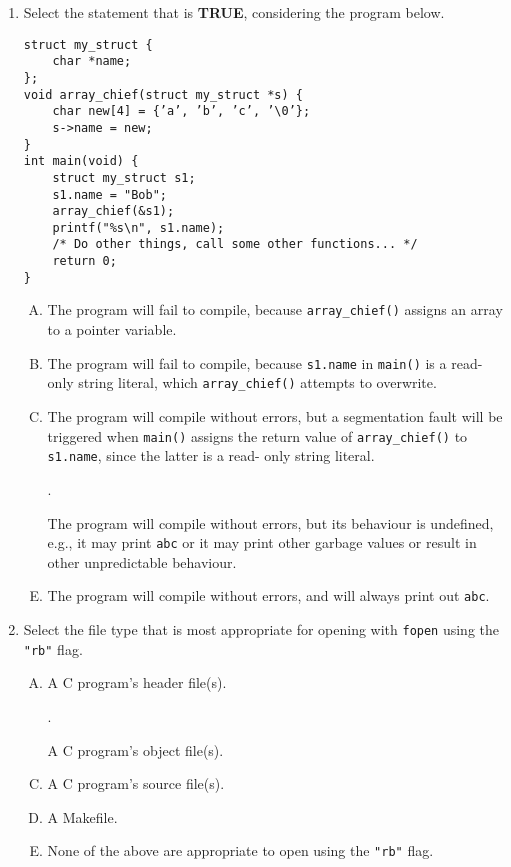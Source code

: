 \documentclass[11pt]{article}
\begin{document}
\begin{enumerate}[{1}.1]
	\newpage
	\item Select the statement that is \textbf{TRUE}, considering the program below.
		\begin{Verbatim}
struct my_struct {
	char *name;
};
void array_chief(struct my_struct *s) {
	char new[4] = {’a’, ’b’, ’c’, ’\0’};
	s->name = new;
}
int main(void) {
	struct my_struct s1;
	s1.name = "Bob";
	array_chief(&s1);
	printf("%s\n", s1.name);
	/* Do other things, call some other functions... */
	return 0;
}
		\end{Verbatim}
		\begin{enumerate}[A.]
			\item The program will fail to compile, because \Verb|array_chief()| assigns an array to a pointer variable.
			\item The program will fail to compile, because \Verb|s1.name| in \Verb|main()| is a read-only string literal, which \Verb|array_chief()| attempts to overwrite.
			\item The program will compile without errors, but a segmentation fault will be triggered when \Verb|main()| assigns the return value of \Verb|array_chief()| to \Verb|s1.name|, since the latter is a read- only string literal.
			\item[\textcolor{correct}{\addtocounter{enumii}{1}\Alph{enumii}.}] \textcolor{correct}{The program will compile without errors, but its behaviour is undefined, e.g., it may print \Verb|abc| or it may print other garbage values or result in other unpredictable behaviour.}
			\item The program will compile without errors, and will always print out \Verb|abc|.
		\end{enumerate}

	\item Select the file type that is most appropriate for opening with \Verb|fopen| using the \Verb|"rb"| flag.
		\begin{enumerate}[A.]
			\item A C program’s header file(s).
			\item[\textcolor{correct}{\addtocounter{enumii}{1}\Alph{enumii}.}] \textcolor{correct}{A C program’s object file(s).}
			\item A C program’s source file(s).
			\item A Makefile.
			\item None of the above are appropriate to open using the \Verb|"rb"| flag.
		\end{enumerate}
\end{enumerate}
\end{document}

